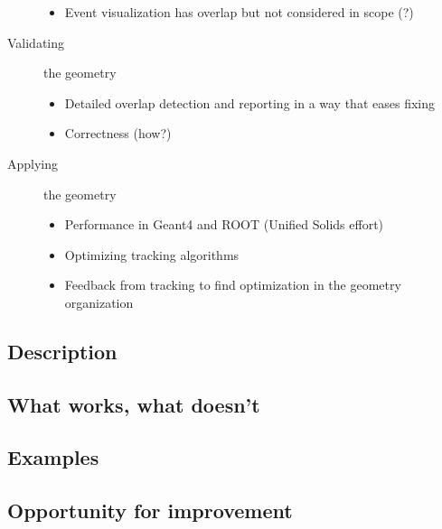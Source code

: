 \begin{description}
\begin{itemize}
  \item Event visualization has overlap but not considered in scope (?)
  \end{itemize}
\item[Validating] the geometry
  \begin{itemize}
  \item Detailed overlap detection and reporting in a way that eases fixing
  \item Correctness (how?)
  \end{itemize}
\item[Applying] the geometry 
  \begin{itemize}
  \item Performance in Geant4 and ROOT (Unified Solids effort)
  \item Optimizing tracking algorithms
  \item Feedback from tracking to find optimization in the geometry organization 
  \end{itemize}
\end{description}

\subsection{Description}
\subsection{What works, what doesn't}
\subsection{Examples}
\subsection{Opportunity for improvement}
